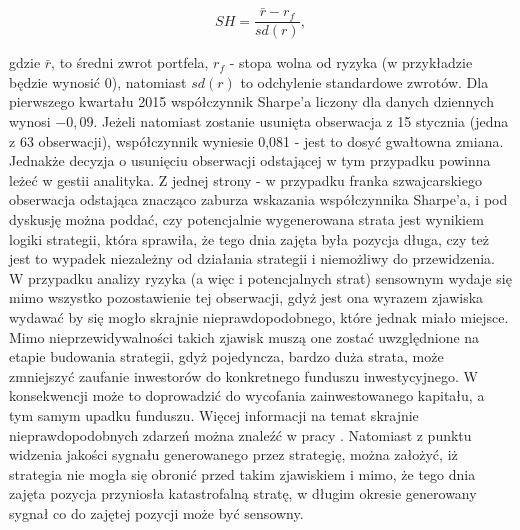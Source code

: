 \documentclass[a4paper,12pt,openany, DIV=calc, headsepline]{scrbook}
\begin{document}
\begin{equation}
\label{eq:sharpe}
SH = \frac{\bar{r} - r_f}{sd(r)},
\end{equation}

gdzie $\bar{r}$, to średni zwrot portfela, $r_f$ - stopa wolna od ryzyka (w przykładzie będzie wynosić $0$), natomiast $sd(r)$ to odchylenie standardowe zwrotów. Dla pierwszego kwartału 2015 współczynnik Sharpe'a liczony dla danych dziennych wynosi $-0,09$. Jeżeli natomiast zostanie usunięta obserwacja z 15 stycznia (jedna z 63 obserwacji), współczynnik wyniesie 0,081 - jest to dosyć gwałtowna zmiana. Jednakże decyzja o usunięciu obserwacji odstającej w tym przypadku powinna leżeć w gestii analityka. Z jednej strony - w przypadku franka szwajcarskiego obserwacja odstająca znacząco zaburza wskazania współczynnika Sharpe'a, i pod dyskusję można poddać, czy potencjalnie wygenerowana strata jest wynikiem logiki strategii, która sprawiła, że tego dnia zajęta była pozycja długa, czy też jest to wypadek niezależny od działania strategii i niemożliwy do przewidzenia. W przypadku analizy ryzyka (a więc i potencjalnych strat) sensownym wydaje się mimo wszystko pozostawienie tej obserwacji, gdyż jest ona wyrazem zjawiska wydawać by się mogło skrajnie  nieprawdopodobnego, które jednak miało miejsce. Mimo nieprzewidywalności takich zjawisk muszą one zostać uwzględnione na etapie budowania strategii, gdyż pojedyncza, bardzo duża strata, może zmniejszyć zaufanie inwestorów do konkretnego funduszu inwestycyjnego. W konsekwencji może to doprowadzić do wycofania zainwestowanego kapitału, a tym samym upadku funduszu. Więcej informacji na temat skrajnie nieprawdopodobnych zdarzeń można znaleźć w pracy \citep{Taleb2007}. Natomiast z punktu widzenia jakości sygnału generowanego przez strategię, można założyć, iż strategia nie mogła się obronić przed takim zjawiskiem i mimo, że tego dnia zajęta pozycja przyniosła katastrofalną stratę, w długim okresie generowany sygnał co do zajętej pozycji może być sensowny.
\end{document}
